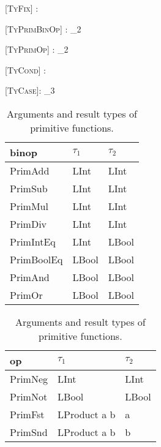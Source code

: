 \begin{prooftree*}
  [\scshape TyFix]{\Gamma \vdash {} : \tau}
\end{prooftree*}

\begin{prooftree*}
  [\scshape TyPrimBinOp]{\Gamma \vdash {} : \tau_2}
\end{prooftree*}

\begin{prooftree*}
  [\scshape TyPrimOp]{\Gamma \vdash {} : \tau_2}
\end{prooftree*}

\begin{prooftree*}
  [\scshape TyCond]{\Gamma \vdash {} : \tau}
\end{prooftree*}

\begin{prooftree*}
  [\scshape TyCase]{\Gamma \vdash {}: \tau_3}
\end{prooftree*}

\begin{table}[ht]
  \centering
  \begin{tabular}[t]{lll}
    binop      & $\tau_1$ & $\tau_2$ \\
    \midrule
    PrimAdd    & LInt     & LInt     \\
    PrimSub    & LInt     & LInt     \\
    PrimMul    & LInt     & LInt     \\
    PrimDiv    & LInt     & LInt     \\
    PrimIntEq  & LInt     & LBool    \\
    PrimBoolEq & LBool    & LBool    \\
    PrimAnd    & LBool    & LBool    \\
    PrimOr     & LBool    & LBool    \\
  \end{tabular}
  \quad
  \centering
  \begin{tabular}[t]{lll}
    op      & $\tau_1$  & $\tau_2$ \\
    \midrule
    PrimNeg & LInt      & LInt     \\
    PrimNot & LBool     & LBool    \\
    PrimFst & LProduct a b & a        \\
    PrimSnd & LProduct a b & b        \\
  \end{tabular}
  \caption{Arguments and result types of primitive functions.}
\end{table}
